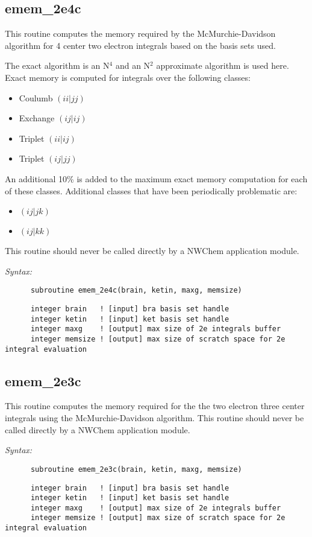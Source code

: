 \subsection{emem\_2e4c} 
This routine computes the memory required by the McMurchie-Davidson  
algorithm for 4 center two electron integrals based on the  
basis sets used.   
 
The exact algorithm is an N$^4$ and an N$^2$ approximate algorithm  
is used here.  Exact memory is computed for integrals over the  
following classes: 
\begin{itemize} 
\item Coulumb $(ii|jj)$ 
\item Exchange $(ij|ij)$ 
\item Triplet $(ii|ij)$ 
\item Triplet $(ij|jj)$ 
\end{itemize} 
An additional 10\% is added to the maximum exact memory  
computation for each of these classes.  Additional classes that  
have been periodically problematic are: 
\begin{itemize} 
\item $(ij|jk)$ 
\item $(ij|kk)$ 
\end{itemize} 
This routine should never be called directly by a  
NWChem application module. 
 
{\it Syntax:} 
\begin{verbatim} 
      subroutine emem_2e4c(brain, ketin, maxg, memsize) 
\end{verbatim} 
\begin{verbatim} 
      integer brain   ! [input] bra basis set handle 
      integer ketin   ! [input] ket basis set handle 
      integer maxg    ! [output] max size of 2e integrals buffer 
      integer memsize ! [output] max size of scratch space for 2e integral evaluation 
\end{verbatim} 
\subsection{emem\_2e3c} 
This routine computes the memory required for the the two electron 
three center integrals using the McMurchie-Davidson algorithm.  
This routine should never be called directly by a  
NWChem application module. 
 
{\it Syntax:} 
\begin{verbatim} 
      subroutine emem_2e3c(brain, ketin, maxg, memsize) 
\end{verbatim} 
\begin{verbatim} 
      integer brain   ! [input] bra basis set handle 
      integer ketin   ! [input] ket basis set handle 
      integer maxg    ! [output] max size of 2e integrals buffer 
      integer memsize ! [output] max size of scratch space for 2e integral evaluation 
\end{verbatim} 
